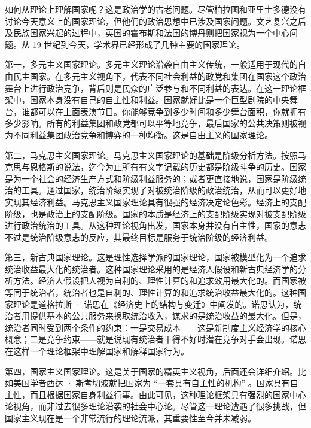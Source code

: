
如何从理论上理解国家呢？这是政治学的古老问题。尽管柏拉图和亚里士多德没有讨论今天意义上的国家理论，但他们的政治思想中已涉及国家问题。文艺复兴之后及民族国家兴起的过程中，英国的霍布斯和法国的博丹则把国家视为一个中心问题。从 19 世纪到今天，学术界已经形成了几种主要的国家理论。

第一，多元主义国家理论。多元主义理论沿袭自由主义传统，一般适用于现代的自由民主国家。在多元主义视角下，代表不同社会利益的政党和集团在国家这个政治舞台上进行政治竞争，背后则是民众的广泛参与和不同利益的表达。在这一理论框架中，国家本身没有自己的自主性和利益。国家就好比是一个巨型剧院的中央舞台，谁都可以在上面表演节目。你能够竞争到多少时间和多少舞台面积，你就拥有多少影响。所有的利益集团和政党都可以平等地竞争，最后国家的公共决策则被视为不同利益集团政治竞争和博弈的一种均衡。这是自由主义的国家理论。

第二，马克思主义国家理论。马克思主义国家理论的基础是阶级分析方法。按照马克思与恩格斯的说法，迄今为止所有有文字记载的历史都是阶级斗争的历史。国家是为一个社会的经济生产方式和阶级利益服务的；或者更直接地说，国家是阶级统治的工具。通过国家，统治阶级实现了对被统治阶级的政治统治，从而可以更好地实现其经济利益。马克思主义国家理论具有很强的经济决定论色彩。经济上的支配阶级，也是政治上的支配阶级。国家的本质是经济上的支配阶级实现对被支配阶级进行政治统治的工具。从这种理论视角出发，国家本身并没有自主性，国家的意志不过是统治阶级意志的反应，其最终目标是服务于统治阶级的经济利益。

第三，新古典国家理论。这是理性选择学派的国家理论，国家被模型化为一个追求统治收益最大化的统治者。这种国家理论采用的是经济人假设和新古典经济学的分析方法。经济人假设把人视为自利的、理性计算的和追求效用最大化的。而国家被等同于统治者，统治者也是自利的、理性计算的和追求统治收益最大化的。这种国家理论是道格拉斯 · 诺思在《经济史上的结构与变迁》中阐发的。诺思认为，统治者用提供基本的公共服务来换取统治收入，谋求的是统治收益的最大化。但是，统治者同时受到两个条件的约束：一是交易成本——这是新制度主义经济学的核心概念；二是竞争约束——就是说现有统治者干得不好时潜在竞争对手会出现。诺思在这样一个理论框架中理解国家和解释国家行为。

第四，国家主义国家理论。这是关于国家的精英主义视角，后面还会详细介绍。比如美国学者西达 · 斯考切波就把国家为 “一套具有自主性的机构” 。国家具有自主性，而且根据国家自身利益行事。由此可见，这种理论框架具有强烈的国家中心论视角，而非过去很多理论沿袭的社会中心论。尽管这一理论遭遇了很多挑战，但国家主义现在是一个非常流行的理论流派，其重要性至今并未减弱。

